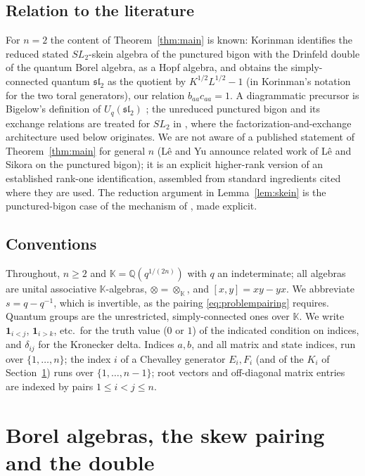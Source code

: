 \documentclass[11pt]{article}
\theoremstyle{remark}
\newcommand{\kk}{\mathbb K}
\newcommand{\U}{U_q}
\newcommand{\ot}{\otimes}
\begin{document}
\subsection{Relation to the literature}

For $n=2$ the content of Theorem~\ref{thm:main} is known: Korinman
\cite[Theorems 1.2 and 2.20]{Ko} identifies the reduced stated
$SL_2$-skein algebra of the punctured bigon with the Drinfeld double of
the quantum Borel algebra, as a Hopf algebra, and obtains the
simply-connected quantum $\mathfrak{sl}_2$ as the quotient by
$K^{1/2}L^{1/2}-1$ (in Korinman's notation for the two toral
generators), our relation $b_{aa}c_{aa}=1$. A diagrammatic
precursor is Bigelow's definition of $\U(\mathfrak{sl}_2)$ \cite{Big};
the unreduced punctured bigon and its exchange relations are treated
for $SL_2$ in \cite[Section 4.8]{CL}, where the
factorization-and-exchange architecture used below originates. We are
not aware of a published statement of Theorem~\ref{thm:main} for
general $n$ (L\^e and Yu \cite[Section 1.9]{LY} announce related work of
L\^e and Sikora on the punctured bigon); it is an explicit higher-rank
version of an established rank-one identification, assembled from
standard ingredients cited where they are used. The reduction argument
in Lemma~\ref{lem:skein} is the punctured-bigon case of the mechanism
of \cite[Theorem 7.2]{LY}, made explicit.

\subsection{Conventions}\label{sec:conventions}

Throughout, $n\ge2$ and $\kk=\mathbb Q(q^{1/(2n)})$ with $q$ an
indeterminate; all algebras are unital associative $\kk$-algebras,
$\ot=\ot_\kk$, and $[x,y]=xy-yx$. We abbreviate $s=q-q^{-1}$, which is
invertible, as the pairing \eqref{eq:problempairing} requires.
Quantum groups are the unrestricted, simply-connected ones over $\kk$.
We write $\mathbf 1_{i<j}$, $\mathbf 1_{i>k}$, etc.\ for the truth
value ($0$ or $1$) of the indicated condition on indices, and
$\delta_{ij}$ for the Kronecker delta. Indices $a,b$, and all matrix and
state indices, run over $\{1,\dots,n\}$; the index $i$ of a Chevalley
generator $E_i,F_i$ (and of the $K_i$ of Section~\ref{sec:double}) runs
over $\{1,\dots,n-1\}$; root vectors and
off-diagonal matrix entries are indexed by pairs $1\le i<j\le n$.

\section{Borel algebras, the skew pairing and the double}\label{sec:double}
\end{document}

